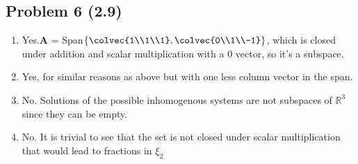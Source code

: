 \documentclass{article}
\begin{document}
\subsection*{Problem 6 (2.9)}
	\begin{enumerate}[label=(\alph*)]
		\item Yes.\textbf{A} = Span$\left\{\colvec{1\\1\\1}, \colvec{0\\1\\-1}\right\}$, which is closed under addition and scalar multiplication with a 0 vector, so it's a subspace.
		\item Yes, for similar reasons as above but with one less column vector in the span.
		\item No. Solutions of the possible inhomogenous systems are not subspaces of $\mathbb{R}^3 $ since they can be empty.
		\item No. It is trivial to see that the set is not closed under scalar multiplication that would lead to fractions in $\xi_2$
	\end{enumerate}
\clearpage
\end{document}
